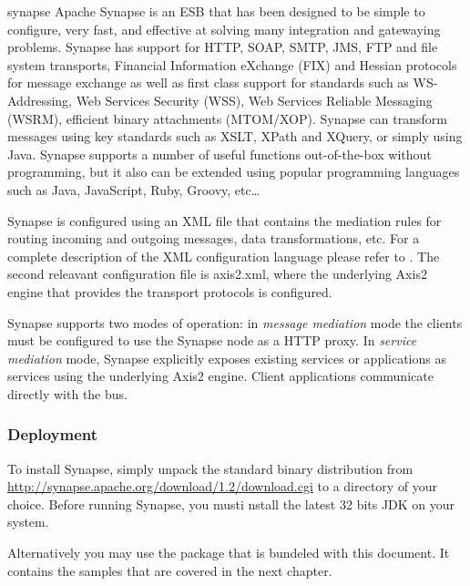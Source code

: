 \begin{mycite}{synapse}
Apache Synapse is an ESB that has been designed to be simple to configure, very
fast, and effective at solving many integration and gatewaying problems. Synapse
has support for HTTP, SOAP, SMTP, JMS, FTP and file system transports, Financial
Information eXchange (FIX) and Hessian protocols for message exchange as well as
first class support for standards such as WS-Addressing, Web Services Security
(WSS), Web Services Reliable Messaging (WSRM), efficient binary attachments
(MTOM/XOP). Synapse can transform messages using key standards such as XSLT,
XPath and XQuery, or simply using Java. Synapse supports a number of useful
functions out-of-the-box without programming, but it also can be extended using
popular programming languages such as Java, JavaScript, Ruby, Groovy, etc\ldots
\end{mycite}

Synapse is configured using an XML file that contains the mediation rules for
routing incoming and outgoing messages, data transformations, etc. For a
complete description of the XML configuration language please refer to 
\supercite{syncf}. The second
releavant configuration file is axis2.xml, where the underlying Axis2 engine
that provides the transport protocols is configured.


Synapse supports two modes of operation: in \emph{message mediation} mode
the clients must be configured to use the Synapse node as a HTTP proxy.
In \emph{service mediation} mode, Synapse explicitly exposes existing services
or applications as services using the underlying Axis2 engine. Client
applications communicate directly with the bus.

\subsubsection{Deployment}
\label{subsec:deployment}

To install Synapse, simply unpack the standard binary distribution from
\url{http://synapse.apache.org/download/1.2/download.cgi} to a directory of
your choice. Before running Synapse, you musti nstall the latest 32 bits JDK on
your system.

Alternatively you may use the package that is bundeled with this document. It
contains the samples that are covered in the next chapter.

